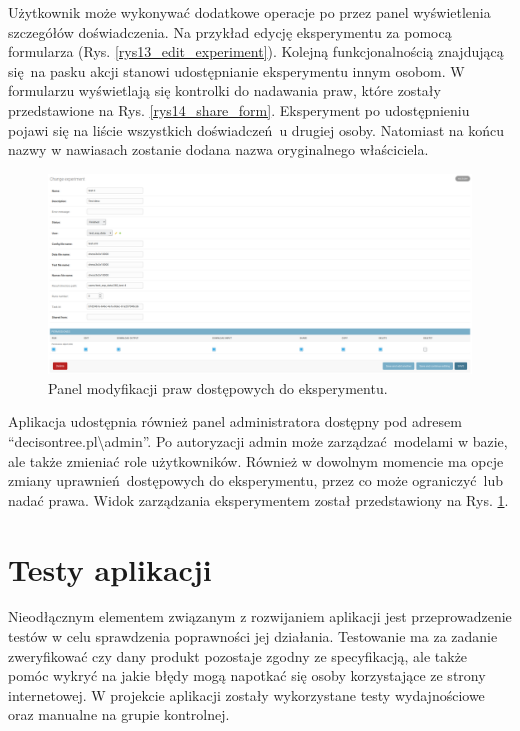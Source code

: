 Użytkownik może wykonywać dodatkowe operacje po przez panel wyświetlenia szczegółów doświadczenia. Na przykład edycję eksperymentu za pomocą formularza (Rys. \ref{rys13_edit_experiment}). Kolejną funkcjonalnością znajdującą się na pasku akcji stanowi udostępnianie eksperymentu innym osobom. W formularzu wyświetlają się kontrolki do nadawania praw, które zostały przedstawione na Rys. \ref{rys14_share_form}. Eksperyment po udostępnieniu pojawi się na liście wszystkich doświadczeń u drugiej osoby. Natomiast na końcu nazwy w nawiasach zostanie dodana nazwa oryginalnego właściciela. 


\begin{figure}[htb]
	\centering
	\includegraphics[width=15cm]{grafika/admin_exp.eps}
	\caption{Panel modyfikacji praw dostępowych do eksperymentu.}
	\label{rys20_admin_exp}
\end{figure}

Aplikacja udostępnia również panel administratora dostępny pod adresem \enquote{decisontree.pl\textbackslash{admin}}. Po autoryzacji admin może zarządzać modelami w bazie, ale także zmieniać role użytkowników. Również w dowolnym momencie ma opcje zmiany uprawnień dostępowych do eksperymentu, przez co może ograniczyć lub nadać prawa. Widok zarządzania eksperymentem został przedstawiony na Rys. \ref{rys20_admin_exp}.

\section{Testy aplikacji}
Nieodłącznym elementem związanym z rozwijaniem aplikacji jest przeprowadzenie testów w celu sprawdzenia poprawności jej działania. Testowanie ma za zadanie zweryfikować czy dany produkt pozostaje zgodny ze specyfikacją, ale także pomóc wykryć na jakie błędy mogą napotkać się osoby korzystające ze strony internetowej. W projekcie aplikacji zostały wykorzystane testy wydajnościowe oraz manualne na grupie kontrolnej.
 
